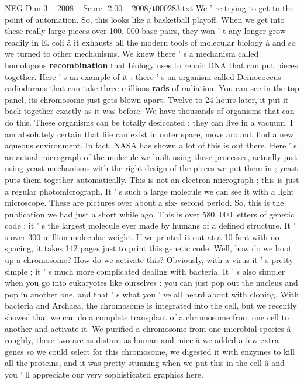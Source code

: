 \begin{textsample}{NEG Dim 3 – 2008 – Score -2.00 – 2008/t000283.txt}
We ' re trying to get to the point of automation.
So, this looks like a basketball playoff.
When we get into these really large pieces over 100, 000 base pairs, they won ' t any longer grow readily in E. coli â it exhausts all the modern tools of molecular biology â and so we turned to other mechanisms.
We knew there ' s a mechanism called homologous \textbf{recombination} that biology uses to repair DNA that can put pieces together.
Here ' s an example of it : there ' s an organism called Deinococcus radiodurans that can take three millions \textbf{rads} of radiation.
You can see in the top panel, its chromosome just gets blown apart.
Twelve to 24 hours later, it put it back together exactly as it was before.
We have thousands of organisms that can do this.
These organisms can be totally desiccated ; they can live in a vacuum.
I am absolutely certain that life can exist in outer space, move around, find a new aqueous environment.
In fact, NASA has shown a lot of this is out there.
Here ' s an actual micrograph of the molecule we built using these processes, actually just using yeast mechanisms with the right design of the pieces we put them in ; yeast puts them together automatically.
This is not an electron micrograph ; this is just a regular photomicrograph.
It ' s such a large molecule we can see it with a light microscope.
These are pictures over about a six- second period.
So, this is the publication we had just a short while ago.
This is over 580, 000 letters of genetic code ; it ' s the largest molecule ever made by humans of a defined structure.
It ' s over 300 million molecular weight.
If we printed it out at a 10 font with no spacing, it takes 142 pages just to print this genetic code.
Well, how do we boot up a chromosome?
How do we activate this?
Obviously, with a virus it ' s pretty simple ; it ' s much more complicated dealing with bacteria.
It ' s also simpler when you go into eukaryotes like ourselves : you can just pop out the nucleus and pop in another one, and that ' s what you ' ve all heard about with cloning.
With bacteria and Archaea, the chromosome is integrated into the cell, but we recently showed that we can do a complete transplant of a chromosome from one cell to another and activate it.
We purified a chromosome from one microbial species â roughly, these two are as distant as human and mice â we added a few extra genes so we could select for this chromosome, we digested it with enzymes to kill all the proteins, and it was pretty stunning when we put this in the cell â and you ' ll appreciate our very sophisticated graphics here.

\end{textsample}
